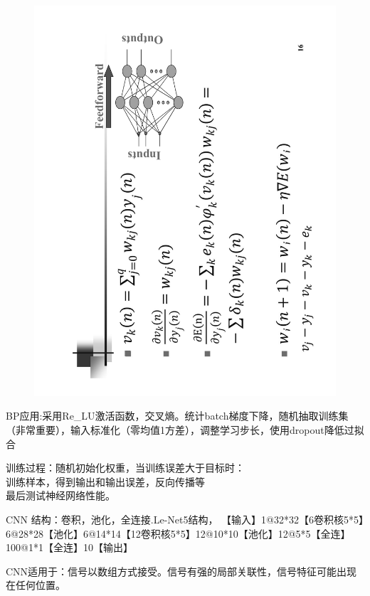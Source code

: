 \documentclass[UTF8,a4paper,landscape,16pt]{paper}
\begin{document}
\begin{multicols}{4}
\begin{figure}[H]
\includegraphics[height=\columnwidth,angle = -90]{NN/7.pdf}
\end{figure}
\noindent BP应用:采用Re\_LU激活函数，交叉熵。统计batch梯度下降，随机抽取训练集（非常重要），输入标准化（零均值1方差），调整学习步长，使用dropout降低过拟合

\noindent 训练过程：随机初始化权重，当训练误差大于目标时：\\
\noindent 训练样本，得到输出和输出误差，反向传播等\\
\noindent 最后测试神经网络性能。

\noindent CNN 结构：卷积，池化，全连接.Le-Net5结构，
【输入】1@32*32【6卷积核5*5】6@28*28【池化】6@14*14【12卷积核5*5】12@10*10【池化】12@5*5【全连】100@1*1【全连】10【输出】

\noindent CNN适用于：信号以数组方式接受。信号有强的局部关联性，信号特征可能出现在任何位置。


\end{multicols}
\end{document}

